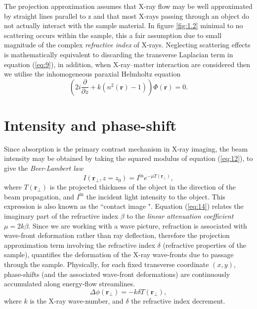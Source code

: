 \documentclass[10pt, a4paper, singlespacing]{report}
\begin{document}
The projection approximation assumes that X-ray flow may be well approximated by straight lines parallel to z\cite{PagsTutes} and that most X-rays passing through an object do not actually interact with the sample material. In figure \ref{fig:1.2} minimal to no scattering occurs within the sample, this a fair assumption due to small magnitude of the complex \textit{refractive index} of X-rays. Neglecting scattering effects is mathematically equivalent to discarding the transverse Laplacian term in equation (\ref{eq:9})\cite{CH49}, in addition, when X-ray--matter interaction are considered then we utilise the inhomogeneous paraxial Helmholtz equation
\begin{equation}\label{eq:13}
\left ( 2 i \frac{\partial }{\partial z} + k ( n^2 (\mathbf{r}) - 1 )\right ) \Phi(\mathbf{r}) = 0.
\end{equation}

\section{Intensity and phase-shift}\label{intensity and phase}
Since absorption is the primary contrast mechanism in X-ray imaging, the beam intensity may be obtained by taking the squared modulus of equation (\ref{eq:12}), to give the \textit{Beer-Lambert law}\cite{PagsTutes}
\begin{equation}\label{eq:14}
I(\mathbf{r}_{\perp}, z = z_0) = I^{\mathrm{in}} e^{-\mu T(\mathbf{r}_{\perp})},
\end{equation}
where $T(\mathbf{r}_{\perp})$ is the projected thickness of the object in the direction of the beam propagation, and $I^{\mathrm{in}}$ the incident light intensity to the object. This expression is also known as the ``contact image ". Equation (\ref{eq:14}) relates the imaginary part of the refractive index $\beta$ to the \textit{linear attenuation coefficient} $\mu = 2k\beta$. 
Since we are working with a wave picture, refraction is associated with wave-front deformation rather than ray deflection, therefore the projection approximation term involving the refractive index $\delta$ (refractive properties of the sample), quantifies the deformation of the X-ray wave-fronts due to passage through the sample. Physically, for each fixed transverse coordinate $(x, y)$, phase-shifts (and the associated wave-front deformations) are continuously accumulated along energy-flow streamlines\cite{PagsTutes}.
\begin{equation}\label{eq:15}
\Delta \phi(\mathbf{r}_{\perp}) = -k \delta T(\mathbf{r}_{\perp}),
\end{equation}
where $k$ is the X-ray wave-number, and $\delta$ the refractive index decrement.
\end{document}
